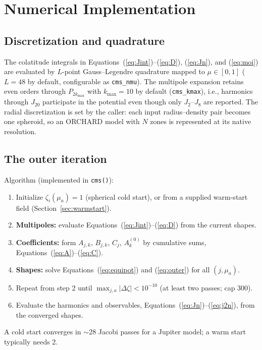 \documentclass{aastex631}
\begin{document}
\section{Numerical Implementation}\label{sec:numerics}

\subsection{Discretization and quadrature}

The colatitude integrals in
Equations~(\ref{eq:Jint})--(\ref{eq:D}), (\ref{eq:Jn}),
and (\ref{eq:moi}) are evaluated by $L$-point Gauss--Legendre quadrature
mapped to $\mu \in [0,1]$ ($L = 48$ by default, configurable as
\texttt{cms\_nmu}).  The multipole expansion retains even orders through
$P_{2k_{\max}}$ with $k_{\max} = 10$ by default (\texttt{cms\_kmax}),
i.e., harmonics through $J_{20}$ participate in the potential even
though only $J_2$--$J_8$ are reported.  The radial discretization is set
by the caller: each input radius--density pair becomes one spheroid, so
an ORCHARD model with $N$ zones is represented at its native resolution.

\subsection{The outer iteration}

Algorithm (implemented in \texttt{cms()}):
\begin{enumerate}
\item Initialize $\zeta_i(\mu_a) = 1$ (spherical cold start), or from a
  supplied warm-start field (Section~\ref{sec:warmstart}).
\item \textbf{Multipoles:} evaluate
  Equations~(\ref{eq:Jint})--(\ref{eq:D}) from the current shapes.
\item \textbf{Coefficients:} form $A_{j,k}$, $B_{j,k}$, $C_j$,
  $A^{(0)}_k$ by cumulative sums, Equations~(\ref{eq:A})--(\ref{eq:C}).
\item \textbf{Shapes:} solve Equations~(\ref{eq:equipot}) and
  (\ref{eq:outer}) for all $(j,\mu_a)$.
\item Repeat from step 2 until
  $\max_{j,a} |\Delta\zeta| < 10^{-10}$ (at least two passes; cap 300).
\item Evaluate the harmonics and observables,
  Equations~(\ref{eq:Jn})--(\ref{eq:j2n}), from the converged shapes.
\end{enumerate}
A cold start converges in $\sim$28 Jacobi passes for a Jupiter model; a
warm start typically needs 2.
\end{document}
